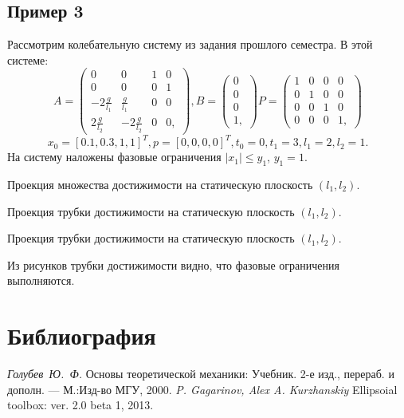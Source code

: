 \documentclass[a4paper, 14pt]{article}
\begin{document}
	\subsection{Пример 3}
		Рассмотрим колебательную систему из задания прошлого семестра. В этой системе:
	$$A =
	\begin{pmatrix}
		0 & 0 & 1 & 0 \\
		0 & 0 & 0 & 1 \\
		-2 \frac{g}{l_1} & \frac{g}{l_1} & 0 & 0 \\
		2 \frac{g}{l_2} & -2\frac{g}{l_2} & 0 & 0,
	\end{pmatrix}, 
	B = 
	\begin{pmatrix}
		0 \\
		0 \\
		0 \\ 
		1, 
	\end{pmatrix}
	P = 
	\begin{pmatrix}
		1 & 0 & 0 & 0 \\
		0 & 1 & 0 & 0\\
		0 & 0 & 1 & 0 \\
		0 & 0 & 0 & 1,
	\end{pmatrix}
	$$	
	$$
		x_0 = [0.1, 0.3, 1, 1]^{T}, p = [0, 0, 0, 0]^{T}, t_0 = 0, t_1 = 3, l_1 = 2, l_2 = 1.
	$$		
	На систему наложены фазовые ограничения $|x_1| \leqslant y_1$,  $y_1 = 1$.
	
	\begin{center}
		Проекция множества достижимости на статическую плоскость $(l_1, l_2)$.
	\end{center}		
	\begin{center}
		Проекция трубки достижимости на статическую плоскость $(l_1, l_2)$.
	\end{center}	
	\begin{center}
		Проекция трубки достижимости на статическую плоскость $(l_1, l_2)$.
	\end{center}	
	
	Из рисунков трубки достижимости видно, что фазовые ограничения выполняются.
\section{Библиография}
  \begin{thebibliography}{99}
     \emph{Голубев~Ю.~Ф.} Основы теоретической механики: Учебник. 2-е изд., перераб. и дополн. --- М.:Изд-во МГУ, 2000.
     \emph{P. Gagarinov, Alex A. Kurzhanskiy} Ellipsoial toolbox: ver. 2.0 beta 1, 2013.
  \end{thebibliography}
\end{document}
